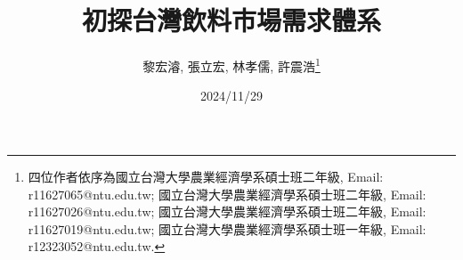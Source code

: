 \documentclass[12pt]{article}
\begin{document}
	
	\title{\Large 初探台灣飲料市場需求體系}
	
	\author{\normalsize 
		黎宏濬, 
		張立宏,  
		林孝儒,  
		許震浩\thanks{四位作者依序為國立台灣大學農業經濟學系碩士班二年級, Email: r11627065@ntu.edu.tw; 國立台灣大學農業經濟學系碩士班二年級, Email: r11627026@ntu.edu.tw; 國立台灣大學農業經濟學系碩士班二年級, Email: r11627019@ntu.edu.tw; 國立台灣大學農業經濟學系碩士班一年級, Email: r12323052@ntu.edu.tw.} \medskip}
	
	\date{2024/11/29} %
	
	\maketitle




\newpage





















\end{document}

